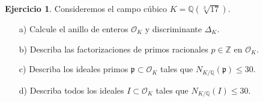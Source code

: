 \documentclass{article}
\newcounter{tarea}
\theoremstyle{definition}
\newtheorem{ejercicio}{Ejercicio}[tarea]
\newcommand{\ZZ}{\mathbb{Z}}
\newcommand{\QQ}{\mathbb{Q}}
\renewcommand{\O}{\mathcal{O}}
\begin{document}
\begin{ejercicio}
  Consideremos el campo cúbico $K = \QQ (\sqrt[3]{17})$.

  \begin{enumerate}
  \item[a)] Calcule el anillo de enteros $\O_K$ y discriminante $\Delta_K$.
  \item[b)] Describa las factorizaciones de primos racionales $p \in \ZZ$ en
    $\O_K$.
  \item[c)] Describa los ideales primos $\mathfrak{p} \subset \O_K$
    tales que $N_{K/\QQ} (\mathfrak{p}) \le 30$.
  \item[d)] Describa todos los ideales $I \subset \O_K$
    tales que $N_{K/\QQ} (I) \le 30$.
  \end{enumerate}
\end{ejercicio}
\end{document}
